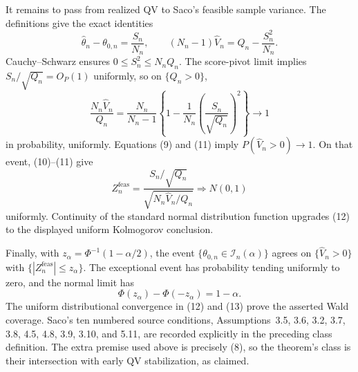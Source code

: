 It remains to pass from realized QV to Saco's feasible sample variance.  The definitions give the exact identities
\[
\widehat\theta_n-\theta_{0,n}=\frac{S_n}{N_n},\qquad
(N_n-1)\widehat V_n=Q_n-\frac{S_n^2}{N_n}.
\tag{10}
\]
Cauchy--Schwarz ensures \(0\le S_n^2\le N_nQ_n\).  The score-pivot limit implies \(S_n/\sqrt{Q_n}=O_P(1)\) uniformly, so on \(\{Q_n>0\}\),
\[
\frac{N_n\widehat V_n}{Q_n}
=\frac{N_n}{N_n-1}\left\{1-\frac1{N_n}\left(\frac{S_n}{\sqrt{Q_n}}\right)^2\right\}\longrightarrow1
\tag{11}
\]
in probability, uniformly.  Equations (9) and (11) imply \(P(\widehat V_n>0)\to1\).  On that event, (10)--(11) give
\[
Z_n^{\mathrm{feas}}
=\frac{S_n/\sqrt{Q_n}}{\sqrt{N_n\widehat V_n/Q_n}}\Rightarrow N(0,1)
\tag{12}
\]
uniformly.  Continuity of the standard normal distribution function upgrades (12) to the displayed uniform Kolmogorov conclusion.

Finally, with \(z_\alpha=\Phi^{-1}(1-\alpha/2)\), the event \(\{\theta_{0,n}\in\mathcal I_n(\alpha)\}\) agrees on \(\{\widehat V_n>0\}\) with \(\{|Z_n^{\mathrm{feas}}|\le z_\alpha\}\).  The exceptional event has probability tending uniformly to zero, and the normal limit has
\[
\Phi(z_\alpha)-\Phi(-z_\alpha)=1-\alpha.
\tag{13}
\]
The uniform distributional convergence in (12) and (13) prove the asserted Wald coverage.  Saco's ten numbered source conditions, Assumptions~3.5, 3.6, 3.2, 3.7, 3.8, 4.5, 4.8, 3.9, 3.10, and 5.11, are recorded explicitly in the preceding class definition.  The extra premise used above is precisely (8), so the theorem's class is their intersection with early QV stabilization, as claimed.